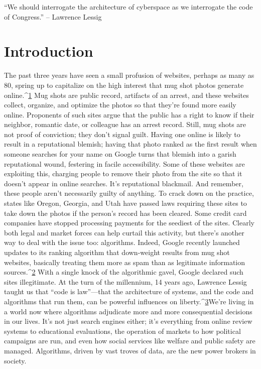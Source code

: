 ``We should interrogate the architecture of cyberspace as we interrogate the code of Congress.''
– Lawrence Lessig 
\chapter{Introduction}
The past three years have seen a small profusion of websites, perhaps as many as 80, spring up to capitalize on the high interest that mug shot photos generate online.^{\href{#endnotes}{1}} Mug shots are public record, artifacts of an arrest, and these websites collect, organize, and optimize the photos so that they're found more easily online. Proponents of such sites argue that the public has a right to know if their neighbor, romantic date, or colleague has an arrest record. Still, mug shots are not proof of conviction; they don't signal guilt. 
Having one online is likely to result in a reputational blemish; having that photo ranked as the first result when someone searches for your name on Google turns that blemish into a garish reputational wound, festering in facile accessibility. Some of these websites are exploiting this, charging people to remove their photo from the site so that it doesn't appear in online searches. It's reputational blackmail. And remember, these people aren't necessarily guilty of anything. 
To crack down on the practice, states like Oregon, Georgia, and Utah have passed laws requiring these sites to take down the photos if the person's record has been cleared. Some credit card companies have stopped processing payments for the seediest of the sites. Clearly both legal and market forces can help curtail this activity, but there's another way to deal with the issue too: algorithms. Indeed, Google recently launched updates to its ranking algorithm that down-weight results from mug shot websites, basically treating them more as spam than as legitimate information sources.^{\href{#endnotes}{2}} With a single knock of the algorithmic gavel, Google declared such sites illegitimate. 
At the turn of the millennium, 14 years ago, Lawrence Lessig taught us that ``code is law''—that the architecture of systems, and the code and algorithms that run them, can be powerful influences on liberty.^{\href{#endnotes}{3}}We're living in a world now where algorithms adjudicate more and more consequential decisions in our lives. It's not just search engines either; it's everything from online review systems to educational evaluations, the operation of markets to how political campaigns are run, and even how social services like welfare and public safety are managed. Algorithms, driven by vast troves of data, are the new power brokers in society. 
